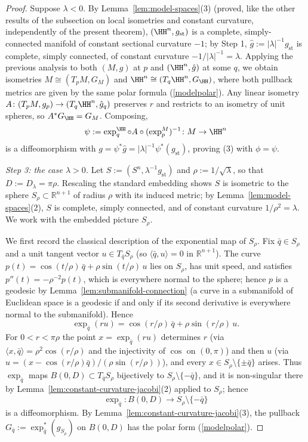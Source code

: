 \begin{proof}
Suppose $\lambda<0$. By Lemma~\ref{lem:model-spaces}(3) (proved,
like the other results of the subsection on local isometries and
constant curvature, independently of the present theorem),
$(\HH^n,g_\mathrm{st})$ is
a complete, simply-connected manifold of constant sectional
curvature $-1$; by Step 1, $\hat g:=|\lambda|^{-1}g_\mathrm{st}$
is complete, simply connected, of constant curvature
$-1/|\lambda|^{-1}=\lambda$. Applying the previous analysis to both
$(M,g)$ at $p$ and $(\HH^n,\hat g)$ at some $q$, we obtain
isometries $M\cong (T_pM,G_M)$ and $\HH^n\cong(T_q\HH^n,G_{\HH})$,
where both pullback metrics are given by the same polar formula
(\ref{modelpolar}). Any linear isometry $A\colon (T_pM,g_p)\to
(T_q\HH^n,\hat g_q)$ preserves $r$ and restricts to an isometry of
unit spheres, so $A^*G_{\HH}=G_M$. Composing,
$$\psi:=\exp_q^{\HH}\circ A\circ(\exp_p^M)^{-1}\colon M\to\HH^n$$
is a diffeomorphism with $g=\psi^*\hat
g=|\lambda|^{-1}\psi^*(g_\mathrm{st})$, proving (3) with
$\phi=\psi$.

\emph{Step 3: the case $\lambda>0$.} Let
$S:=(S^n,\lambda^{-1}g_\mathrm{st})$ and
$\rho:=1/\sqrt\lambda$, so that $D:=D_\lambda=\pi\rho$. Rescaling
the standard embedding shows $S$ is isometric to the sphere
$S_\rho\subset \mathbb{R}^{n+1}$ of radius $\rho$ with its induced
metric; by Lemma~\ref{lem:model-spaces}(2), $S$ is complete,
simply connected, and of constant curvature
$1/\rho^2=\lambda$. We
work with the embedded picture $S_\rho$.

We first record the classical description of the exponential map of
$S_\rho$. Fix $\bar q\in S_\rho$ and a unit tangent vector $u\in
T_{\bar q}S_\rho$ (so $\langle \bar q,u\rangle=0$ in
$\mathbb{R}^{n+1}$). The curve
$p(t)=\cos(t/\rho)\,\bar q+\rho\sin(t/\rho)\,u$ lies on $S_\rho$,
has unit speed, and satisfies $p''(t)=-\rho^{-2}p(t)$, which is
everywhere normal to the sphere; hence $p$ is a geodesic by
Lemma~\ref{lem:submanifold-connection} (a curve in a submanifold of
Euclidean space is a geodesic if and only if its second derivative
is everywhere normal to the submanifold). Hence
$$\exp_{\bar q}(ru)=\cos(r/\rho)\,\bar q+\rho\sin(r/\rho)\,u.$$
For $0<r<\pi\rho$ the point $x=\exp_{\bar q}(ru)$ determines
$r$ (via $\langle x,\bar q\rangle=\rho^2\cos(r/\rho)$ and the
injectivity of $\cos$ on $(0,\pi)$) and then $u$ (via
$u=(x-\cos(r/\rho)\bar q)/(\rho\sin(r/\rho))$), and every $x\in
S_\rho\setminus\{\pm\bar q\}$ arises. Thus
$\exp_{\bar q}$ maps $B(0,D)\subset T_{\bar q}S_\rho$ bijectively to
$S_\rho\setminus\{-\bar q\}$, and it is non-singular there by
Lemma~\ref{lem:constant-curvature-jacobi}(2) applied to $S_\rho$;
hence
$$\exp_{\bar q}\colon B(0,D)\to S_\rho\setminus\{-\bar q\}$$
is a diffeomorphism. By
Lemma~\ref{lem:constant-curvature-jacobi}(3), the pullback
$G_{\bar q}:=\exp_{\bar q}^*(g_{S_\rho})$ on $B(0,D)$ has the polar
form (\ref{modelpolar}).


\end{proof}
